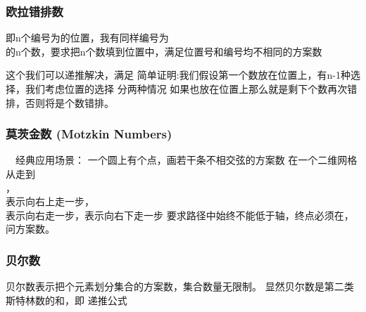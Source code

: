 \documentclass[8pt,a4paper]{article}
\newcommand{\txt}[1]{\par\noindent\footnotesize #1}
\newcommand{\inlineformula}[1]{\ensuremath{}}
\newcommand{\displayformula}[1]{%
    \vspace{0.2em}
    \[
        
    \]
}
\begin{document}
\begin{multicols}{2}
        \subsubsection{欧拉错排数}
            \txt{即n个编号为\inlineformula{./assets/formulas_tex/formula_263.tex}的位置，我有同样编号为\displayformula{./assets/formulas_tex/formula_264.tex}的n个数，要求把n个数填到位置中，满足位置号和编号均不相同的方案数\displayformula{./assets/formulas_tex/formula_265.tex}
这个我们可以递推解决，满足\inlineformula{./assets/formulas_tex/formula_266.tex}
简单证明:我们假设第一个数放在位置\inlineformula{./assets/formulas_tex/formula_267.tex}上，\inlineformula{./assets/formulas_tex/formula_268.tex}有n-1种选择，我们考虑\inlineformula{./assets/formulas_tex/formula_269.tex}位置的选择 分两种情况
如果\inlineformula{./assets/formulas_tex/formula_270.tex}也放在\inlineformula{./assets/formulas_tex/formula_271.tex}位置上那么就是剩下\inlineformula{./assets/formulas_tex/formula_272.tex}个数再次错排，否则将是\inlineformula{./assets/formulas_tex/formula_273.tex}个数错排。}
        \subsubsection{莫茨金数 (Motzkin Numbers)}
            \txt{\inlineformula{./assets/formulas_tex/formula_274.tex}
\inlineformula{./assets/formulas_tex/formula_275.tex}
\inlineformula{./assets/formulas_tex/formula_276.tex}
经典应用场景：
\inlineformula{./assets/formulas_tex/formula_277.tex}一个圆上有\inlineformula{./assets/formulas_tex/formula_278.tex}个点，画若干条不相交弦的方案数
\inlineformula{./assets/formulas_tex/formula_279.tex}在一个二维网格从\inlineformula{./assets/formulas_tex/formula_280.tex}走到\displayformula{./assets/formulas_tex/formula_281.tex}，\displayformula{./assets/formulas_tex/formula_282.tex}表示向右上走一步，\displayformula{./assets/formulas_tex/formula_283.tex}表示向右走一步，\inlineformula{./assets/formulas_tex/formula_284.tex}表示向右下走一步
要求路径中始终不能低于\inlineformula{./assets/formulas_tex/formula_285.tex}轴，终点必须在\inlineformula{./assets/formulas_tex/formula_286.tex}，问方案数。}
        \subsubsection{贝尔数}
            \txt{贝尔数\inlineformula{./assets/formulas_tex/formula_287.tex}表示把\inlineformula{./assets/formulas_tex/formula_288.tex}个元素划分集合的方案数，集合数量无限制。
显然贝尔数是第二类斯特林数的和，即\inlineformula{./assets/formulas_tex/formula_289.tex}
递推公式\inlineformula{./assets/formulas_tex/formula_290.tex}
\inlineformula{./assets/formulas_tex/formula_291.tex}}

\end{multicols}
\end{document}
